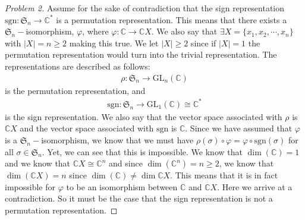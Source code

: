 \documentclass[titlepage]{article}
\theoremstyle{plain}
\theoremstyle{definition}
\theoremstyle{remark}
\theoremstyle{exercise-style}
\numberwithin{equation}{section}
\numberwithin{theorem}{section}
\numberwithin{remark}{section}
\begin{document}
\begin{proof}[Problem 2]
    Assume for the sake of contradiction that the sign representation $\mathrm{sgn}: \mathfrak{S}_n \to \mathbb{C^*}$ is a permutation representation. This means that there exists a $\mathfrak{S}_n-$isomorphism, $\varphi$, where $\varphi: \mathbb{C} \to \mathbb{C}X$. We also say that $\exists X = \{ x_1, x_2, \cdots , x_n \}$ with $|X|=n \geq 2$ making this true. We let $|X|\geq 2$ since if $|X|=1$ the permutation representation would turn into the trivial representation. The representations are described as follows:
    \begin{align}
        \rho :\mathfrak{S}_n \to \mathrm{GL}_n(\mathbb{C})
    \end{align}
    is the permutation representation, and
    \begin{align}
        \mathrm{sgn} : \mathfrak{S}_n \to \mathrm{GL}_1(\mathbb{C}) \cong \mathbb{C}^* 
    \end{align}
    is the sign representation. We also say that the vector space associated with $\rho$ is $\mathbb{C}X$ and the vector space associated with $\mathrm{sgn}$ is $\mathbb{C}$. Since we have assumed that $\varphi$ is a $\mathfrak{S}_n-$isomorphism, we know that we must have $\rho(\sigma)\circ\varphi = \varphi \circ \mathrm{sgn}(\sigma)$ for all $\sigma \in \mathfrak{S}_n$. Yet, we can see that this is impossible. We know that $\dim (\mathbb C) = 1$ and we know that $\mathbb{C}X \cong \mathbb{C}^n$ and since $\dim (\mathbb C^n) = n \geq 2$, we know that $\dim (\mathbb C X) = n$ since $\dim (\mathbb C) \neq \dim \mathbb CX$. This means that it is in fact impossible for $\varphi$ to be an isomorphism between $\mathbb C$ and $\mathbb CX$. Here we arrive at a contradiction. So it must be the case that the sign representation is not a permutation representation.
\end{proof}
\end{document}

